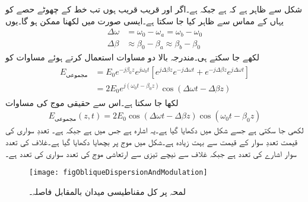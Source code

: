 شکل   سے ظاہر ہے کہ  ہے جبکہ 
 ہے۔اگر  اور  قریب قریب ہوں تب  خط کے چھوٹے حصے کو یہاں کے مماس سے ظاہر کیا جا سکتا ہے۔ایسی صورت میں   لکھنا ممکن ہو گا۔یوں
\begin{align}
\Delta \omega&=\omega_0-\omega_a=\omega_b-\omega_0\\
\Delta \beta&\approx\beta_0-\beta_a\approx\beta_b-\beta_0
\end{align}
لکھے جا سکتے ہی۔مندرجہ بالا دو مساوات استعمال کرتے ہوئے مساوات  کو
\begin{gather}
\begin{aligned}
E_{\text{مجموعی}}&=E_0 e^{-j \beta_0 z} e^{j \omega_0 t}\left[e^{j \Delta \beta z} e^{-j \Delta \omega t}+e^{-j \Delta \beta z} e^{j \Delta \omega t}\right]\\
&=2 E_0 e^{j(\omega_0 t -\beta_0 z)} \cos(\Delta \omega t-\Delta \beta z)
\end{aligned}
\end{gather}
 لکھا جا سکتا ہے۔اس سے حقیقی موج کی مساوات
\begin{align}\label{مساوات_ترچھی_انتشار_سوار_اشارہ}
E_{\text{مجموعی}}(z,t)=2 E_0 \cos(\Delta \omega t-\Delta \beta z) \cos (\omega_0 t -\beta_0 z)
\end{align}
لکھی جا سکتی ہے جسے شکل  میں دکھایا گیا ہے۔یہ  اشارہ ہے جس میں   ہے جبکہ   ہے۔ تعددِ سواری کی قیمت تعددِ سوار کے قیمت سے بہت زیادہ ہے۔شکل میں موج پر  بچھایا دکھایا گیا ہے۔غلاف کی تعدد سوار اشارے کی تعدد ہے جبکہ غلاف سے نیچے تیزی سے ارتعاشی موج کی تعدد سواری کی تعدد ہے۔  
\begin{figure}
\centering
\texttt{[image: figObliqueDispersionAndModulation]}
\caption{لمحہ  پر کل مقناطیسی میدان بالمقابل فاصلہ۔}
\label{شکل_ترچھی_سوار_اشارہ_انتشار}
\end{figure}

